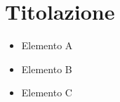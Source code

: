 \documentclass[twoside]{supsistudent}
\begin{document}
\chapter{Titolazione}

\lipsum[13]

\begin{itemize}
  \item Elemento A
  \item Elemento B
  \item Elemento C
\end{itemize}

%

\lipsum[23]
%
%
%
%
%
%
%
%
%
%



\end{document}
